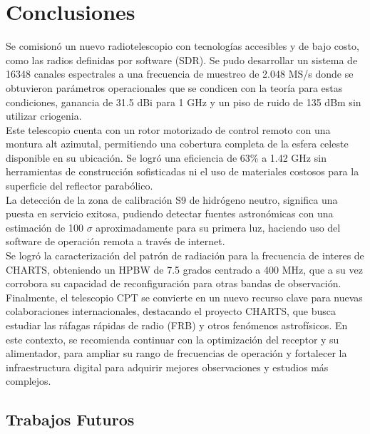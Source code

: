 \chapter{Conclusiones}

Se comisionó un nuevo radiotelescopio con tecnologías accesibles y de bajo costo, como las radios definidas por software (SDR). Se pudo desarrollar un sistema de 16348 canales espectrales a una frecuencia de muestreo de 2.048 MS/s donde se obtuvieron parámetros operacionales que se condicen con la teoría para estas condiciones, ganancia de 31.5 dBi para 1 GHz y un piso de ruido de 135 dBm sin utilizar criogenia.\\

Este telescopio cuenta con un rotor motorizado de control remoto con una montura alt azimutal, permitiendo una cobertura completa de la esfera celeste disponible en su ubicación. Se logró una eficiencia de 63\% a 1.42 GHz sin herramientas de construcción sofisticadas ni el uso de materiales costosos para la superficie del reflector parabólico.\\

La detección de la zona de calibración S9 de hidrógeno neutro, significa una puesta en servicio exitosa, pudiendo detectar fuentes astronómicas con una estimación de 100 $\sigma$ aproximadamente para su primera luz, haciendo uso del software de operación remota a través de internet.\\

Se logró la caracterización del patrón de radiación para la frecuencia de interes de CHARTS, obteniendo un HPBW de 7.5 grados centrado a 400 MHz, que a su vez corrobora su capacidad de reconfiguración para otras bandas de observación.\\

Finalmente, el telescopio CPT se convierte en un nuevo recurso clave para nuevas colaboraciones internacionales, destacando el proyecto CHARTS, que busca estudiar las ráfagas rápidas de radio (FRB) y otros fenómenos astrofísicos. En este contexto, se recomienda continuar con la optimización del receptor y su alimentador, para ampliar su rango de frecuencias de operación y fortalecer la infraestructura digital para adquirir mejores observaciones y estudios más complejos.\\

\section{Trabajos Futuros}

